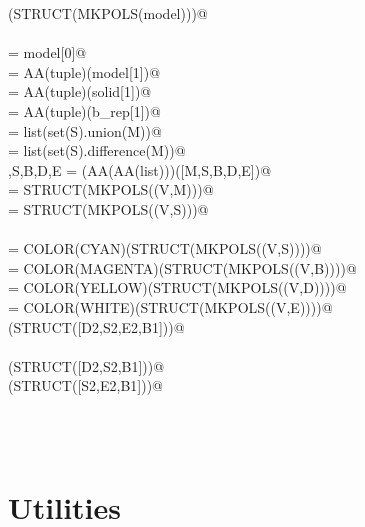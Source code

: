 \documentclass[11pt,oneside]{article}	%
\begin{document}
\begin{flushleft}
\begin{minipage}{\linewidth}
\begin{list}{}{}
\mbox{}\verb@VIEW(STRUCT(MKPOLS(model)))@\\
\mbox{}\verb@@\\
\mbox{}\verb@V = model[0]@\\
\mbox{}\verb@M = AA(tuple)(model[1])@\\
\mbox{}\verb@S = AA(tuple)(solid[1])@\\
\mbox{}\verb@B = AA(tuple)(b_rep[1])@\\
\mbox{}\verb@D = list(set(S).union(M))@\\
\mbox{}\verb@E = list(set(S).difference(M))@\\
\mbox{}\verb@M,S,B,D,E = (AA(AA(list)))([M,S,B,D,E])@\\
\mbox{} = STRUCT(MKPOLS((V,M)))@\\
\mbox{} = STRUCT(MKPOLS((V,S)))@\\
\mbox{}\verb@@\\
\mbox{} = COLOR(CYAN)(STRUCT(MKPOLS((V,S))))@\\
\mbox{} = COLOR(MAGENTA)(STRUCT(MKPOLS((V,B))))@\\
\mbox{} = COLOR(YELLOW)(STRUCT(MKPOLS((V,D))))@\\
\mbox{} = COLOR(WHITE)(STRUCT(MKPOLS((V,E))))@\\
\mbox{}\verb@VIEW(STRUCT([D2,S2,E2,B1]))@\\
\mbox{}\verb@@\\
\mbox{}\verb@VIEW(STRUCT([D2,S2,B1]))@\\
\mbox{}\verb@VIEW(STRUCT([S2,E2,B1]))@\\
\mbox{}\verb@@\\
\mbox{}\verb@@{\NWsep}
\end{list}
\vspace{-2ex}
\end{minipage}\\[4ex]
\end{flushleft}



\appendix
\section{Utilities}
\end{document}
